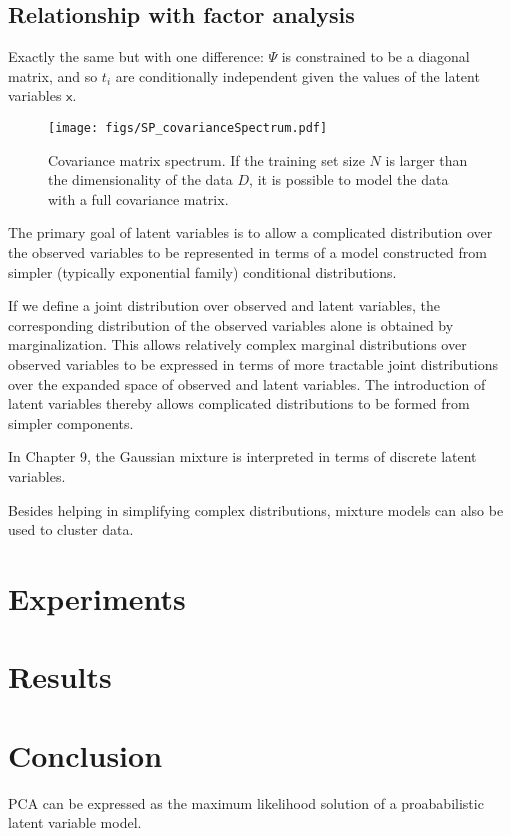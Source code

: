 \subsection{Relationship with factor analysis}

Exactly the same but with one difference: $\Psi$ is constrained to be a diagonal matrix, and so $t_i$ are conditionally independent given the values of the latent variables $\mathsf{x}$.

								\begin{figure}
								\centering
								\texttt{[image: figs/SP\_covarianceSpectrum.pdf]}
								\caption{Covariance matrix spectrum.  If the training set size $N$ is larger than the dimensionality of the data $D$, it is possible to model the data with a full covariance matrix.} 
								\label{fig:covariance_matrix_spectrum}
								\end{figure}

The primary goal of latent variables is to allow a complicated distribution over the observed variables to be represented in terms of a model constructed from simpler (typically exponential family) conditional distributions.

If we define a joint distribution over observed and latent variables, the corresponding distribution of the observed variables alone is obtained by marginalization.  This allows relatively complex marginal distributions over observed variables to be expressed in terms of more tractable joint distributions over the expanded space of observed and latent variables.  The introduction of latent variables thereby allows complicated distributions to be formed from simpler components.  

In Chapter 9, the Gaussian mixture is interpreted in terms of discrete latent variables.  

Besides helping in	 simplifying complex distributions, mixture models can also be used to cluster data.




\section{Experiments}

\section{Results}

\section{Conclusion}
PCA can be expressed as the maximum likelihood solution of a proababilistic latent variable model.



